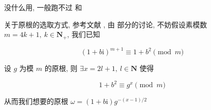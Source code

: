 没什么用, 一般跑不过  和 

关于原根的选取方式, 参考文献 \cite{ieee1451721}, 由  部分的讨论, 不妨假设素模数 \(m=4k+1,~k\in\mathbf{N}_+\), 我们已知

\[
    \left(1+b\mathrm{i}\right)^{m+1}\equiv 1+b^2\pmod m
\]

设 \(g\) 为模 \(m\) 的原根, 则 \(\exists x=2l+1,~l\in\mathbf{N}\) 使得

\[
    1+b^2\equiv g^x\pmod m
\]

从而我们想要的原根 \(\omega=\left(1+b\mathrm{i}\right)g^{-(x-1)/2}\)
